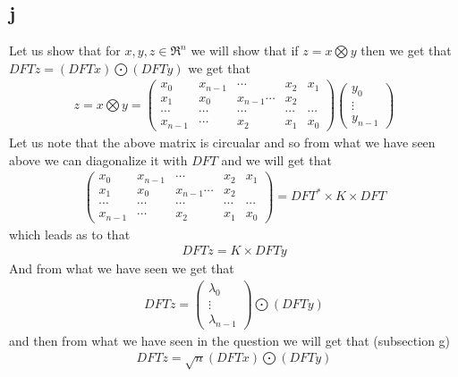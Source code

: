 \documentclass[english]{extarticle}
\numberwithin{equation}{section}
\numberwithin{figure}{section}
\begin{document}
\subsection*{j}
Let us show that for $x,y,z \in \Re^{n}$ we will show that if $z = x \bigotimes y$ then we get that $DFT z = (DFT x)\bigodot(DFT y)$ we get that 
\begin{align}
    z = x \bigotimes y  = \begin{pmatrix}
        x_{0} & x_{n-1} & \cdots & x_{2}& x_{1} \\ x_{1} & x_{0} & x_{n-1} \cdots & x_{2} \\ \cdots & \cdots & \cdots & \cdots& \cdots \\ x_{n-1} & \cdots & x_{2}& x_{1} & x_{0}
    \end{pmatrix}
    \begin{pmatrix}
        y_{0} \\ \vdots \\y_{n-1}
    \end{pmatrix}
\end{align}
Let us note that the above matrix is circualar and so from what we have seen above we can diagonalize it with $DFT$ and we will get that 
\begin{align}
    \begin{pmatrix}
        x_{0} & x_{n-1} & \cdots & x_{2}& x_{1} \\ x_{1} & x_{0} & x_{n-1} \cdots & x_{2} \\ \cdots & \cdots & \cdots & \cdots& \cdots \\ x_{n-1} & \cdots & x_{2}& x_{1} & x_{0}
    \end{pmatrix} = DFT^{*} \times K \times DFT
\end{align}
which leads as to that
\begin{align}
    DFT z = K \times DFT y
\end{align}
And from what we have seen we get that
\begin{align}
    DFT z = \begin{pmatrix}
        \lambda_{0} \\ \vdots \\\lambda_{n-1}
    \end{pmatrix} \bigodot(DFT y)
\end{align}
and then from what we have seen in the question we will get that (subsection g)
\begin{align}
    DFT z = \sqrt{n} (DFT x) \bigodot (DFT y)
\end{align}
\end{document}
